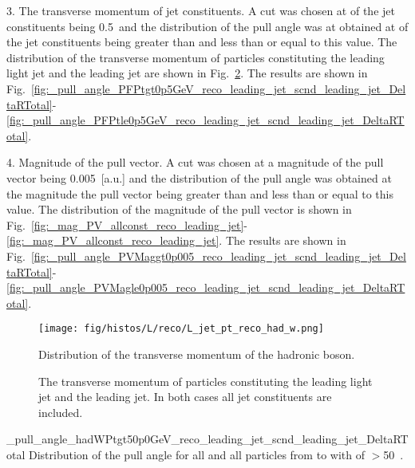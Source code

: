 3. The transverse momentum \pt of jet constituents. A cut was chosen at \pt of the jet constituents being 0.5~\GeV and the distribution of the pull angle was at obtained at \pt of the jet constituents being greater than and less than or equal to this value. The distribution of the transverse momentum of particles constituting the leading light jet and the leading \cPqb jet are shown in Fig.~\ref{fig:L_JetConstPT_allconst_reco}. The results are shown in Fig.~\ref{fig:_pull_angle_PFPtgt0p5GeV_reco_leading_jet_scnd_leading_jet_DeltaRTotal}-\ref{fig:_pull_angle_PFPtle0p5GeV_reco_leading_jet_scnd_leading_jet_DeltaRTotal}.

4. Magnitude of the pull vector. A cut was chosen at a magnitude of the pull vector being 0.005~[a.u.] and the distribution of the pull angle was obtained at the magnitude the pull vector being greater than and less than or equal to this value. The distribution of the magnitude of the pull vector is shown in Fig.~\ref{fig:_mag_PV_allconst_reco_leading_jet}-\ref{fig:_mag_PV_allconst_reco_leading_jet}. The results are shown in Fig.~\ref{fig:_pull_angle_PVMaggt0p005_reco_leading_jet_scnd_leading_jet_DeltaRTotal}-\ref{fig:_pull_angle_PVMagle0p005_reco_leading_jet_scnd_leading_jet_DeltaRTotal}.

\begin{figure}
\centering
\texttt{[image: fig/histos/L/reco/L\_jet\_pt\_reco\_had\_w.png]}
\caption{Distribution of the transverse momentum \pt of the hadronic \PW boson.}
\label{fig:L_jet_pt_reco_had_w}
\end{figure}

\begin{figure}[hbtp]
    \centering
        \def\twidth{0.45}
\caption{The transverse momentum \pt of particles constituting the leading light jet and the leading \cPqb jet. In both cases all jet constituents are included.}
\label{fig:L_JetConstPT_allconst_reco}

\end{figure}

     {_pull_angle_hadWPtgt50p0GeV_reco_leading_jet_scnd_leading_jet_DeltaRTotal}
     {Distribution of the pull angle for all \DeltaR and all particles from \leadingjet to \scndleadingjet with \pt of \PW $>$50~\GeV.}

